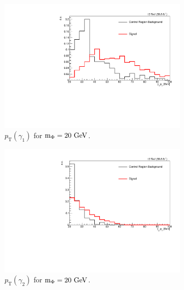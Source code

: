 \begin{figure}[htb!]
	\centering
	\captionsetup[subfigure]{justification=centering}
	\begin{subfigure}[h]{0.45\linewidth}
		\centering
		\includegraphics[width=\linewidth]{figs/05_analysis/2018_ZX_g1_pt_mx20_MU_comp.pdf}
		\caption{$p_\mathrm{T}(\gamma_1)$ for $\mphi=20\unit{GeV}$.}
	\end{subfigure}
	\begin{subfigure}[h]{0.45\linewidth}
		\centering
		\includegraphics[width=\linewidth]{figs/05_analysis/2018_ZX_g2_pt_mx20_MU_comp.pdf}
		\caption{$p_\mathrm{T}(\gamma_2)$ for $\mphi=20\unit{GeV}$.}
	\end{subfigure}
	\begin{subfigure}[h]{0.45\linewidth}
		\centering

\end{subfigure}
\end{figure}
